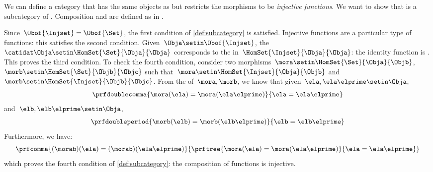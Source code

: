 \begin{example}
    \label{ex:Injset}
    We can define a category \Injset that has the same objects as \Set but restricts the morphisms to be \emph{injective functions}.
    We want to show that \Injset is a subcategory of \Set.
    Composition and   are defined as in \Set.

    Since~$\Obof{\Injset}=\Obof{\Set}$, the first condition of \cref{def:subcategory} is satisfied.
    Injective functions are a particular type of functions: this satisfies the second condition.
    Given~$\Obja\setin \Obof{\Injset}$, the ~$\catidat\Obja\setin \HomSet{\Set}{\Obja}{\Obja}$ corresponds to the  in~$\HomSet{\Injset}{\Obja}{\Obja}$: the identity function is .
    This proves the third condition.
    To check the fourth condition, consider two morphisms~$\mora \setin \HomSet{\Set}{\Obja}{\Objb}$,~$\morb \setin \HomSet{\Set}{\Objb}{\Objc}$ such that~$\mora \setin \HomSet{\Injset}{\Obja}{\Objb}$ and~$\morb\setin \HomSet{\Injset}{\Objb}{\Objc}$.
    From the  of~$\mora,\morb$, we know that given~$\ela,\ela\elprime\setin \Obja$,
    \begin{equation}
        \prfdoublecomma{
            \mora(\ela)=\mora(\ela\elprime)
        }{
            \ela=\ela\elprime
        }
    \end{equation}
    and~$\elb,\elb\elprime\setin \Obja$,
    \begin{equation}
        \prfdoubleperiod{
            \morb(\elb)=\morb(\elb\elprime)
        }{
            \elb=\elb\elprime
        }
    \end{equation}
    Furthermore, we have:
    \begin{equation}
        \prfcomma{
            (\morab)(\ela)
            =(\morab)(\ela\elprime)
        }{
            \prftree{
                \mora(\ela)=\mora(\ela\elprime)
            }{
                \ela=\ela\elprime
            }
        }
    \end{equation}
    which proves the fourth condition of \cref{def:subcategory}: the composition of  functions is injective.
\end{example}

